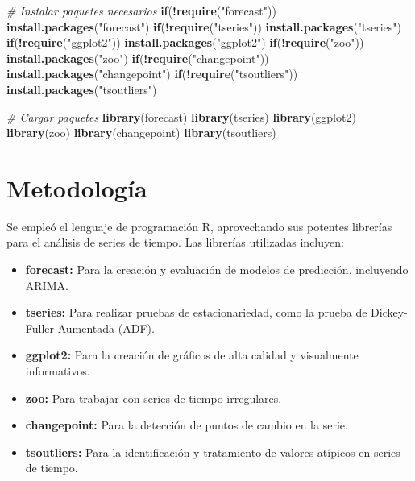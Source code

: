 \documentclass[
]{book}
\newenvironment{Shaded}{\begin{snugshade}}{\end{snugshade}}
\newcommand{\CommentTok}[1]{\textcolor[rgb]{0.56,0.35,0.01}{\textit{#1}}}
\newcommand{\ControlFlowTok}[1]{\textcolor[rgb]{0.13,0.29,0.53}{\textbf{#1}}}
\newcommand{\FunctionTok}[1]{\textcolor[rgb]{0.13,0.29,0.53}{\textbf{#1}}}
\newcommand{\NormalTok}[1]{#1}
\newcommand{\SpecialCharTok}[1]{\textcolor[rgb]{0.81,0.36,0.00}{\textbf{#1}}}
\newcommand{\StringTok}[1]{\textcolor[rgb]{0.31,0.60,0.02}{#1}}
\begin{document}
\begin{Shaded}
\begin{Highlighting}[]
\CommentTok{\# Instalar paquetes necesarios}
\ControlFlowTok{if}\NormalTok{(}\SpecialCharTok{!}\FunctionTok{require}\NormalTok{(}\StringTok{"forecast"}\NormalTok{)) }\FunctionTok{install.packages}\NormalTok{(}\StringTok{"forecast"}\NormalTok{)}
\ControlFlowTok{if}\NormalTok{(}\SpecialCharTok{!}\FunctionTok{require}\NormalTok{(}\StringTok{"tseries"}\NormalTok{)) }\FunctionTok{install.packages}\NormalTok{(}\StringTok{"tseries"}\NormalTok{)}
\ControlFlowTok{if}\NormalTok{(}\SpecialCharTok{!}\FunctionTok{require}\NormalTok{(}\StringTok{"ggplot2"}\NormalTok{)) }\FunctionTok{install.packages}\NormalTok{(}\StringTok{"ggplot2"}\NormalTok{)}
\ControlFlowTok{if}\NormalTok{(}\SpecialCharTok{!}\FunctionTok{require}\NormalTok{(}\StringTok{"zoo"}\NormalTok{)) }\FunctionTok{install.packages}\NormalTok{(}\StringTok{"zoo"}\NormalTok{)}
\ControlFlowTok{if}\NormalTok{(}\SpecialCharTok{!}\FunctionTok{require}\NormalTok{(}\StringTok{"changepoint"}\NormalTok{)) }\FunctionTok{install.packages}\NormalTok{(}\StringTok{"changepoint"}\NormalTok{)}
\ControlFlowTok{if}\NormalTok{(}\SpecialCharTok{!}\FunctionTok{require}\NormalTok{(}\StringTok{"tsoutliers"}\NormalTok{)) }\FunctionTok{install.packages}\NormalTok{(}\StringTok{"tsoutliers"}\NormalTok{)}


\CommentTok{\# Cargar paquetes}
\FunctionTok{library}\NormalTok{(forecast)}
\FunctionTok{library}\NormalTok{(tseries)}
\FunctionTok{library}\NormalTok{(ggplot2)}
\FunctionTok{library}\NormalTok{(zoo)}
\FunctionTok{library}\NormalTok{(changepoint)}
\FunctionTok{library}\NormalTok{(tsoutliers)}
\end{Highlighting}
\end{Shaded}

\section{Metodología}\label{metodologuxeda}

Se empleó el lenguaje de programación R, aprovechando sus potentes librerías para el análisis de series de tiempo. Las librerías utilizadas incluyen:

\begin{itemize}
\item
  \textbf{forecast:} Para la creación y evaluación de modelos de predicción, incluyendo ARIMA.
\item
  \textbf{tseries:} Para realizar pruebas de estacionariedad, como la prueba de Dickey-Fuller Aumentada (ADF).
\item
  \textbf{ggplot2:} Para la creación de gráficos de alta calidad y visualmente informativos.
\item
  \textbf{zoo:} Para trabajar con series de tiempo irregulares.
\item
  \textbf{changepoint:} Para la detección de puntos de cambio en la serie.
\item
  \textbf{tsoutliers:} Para la identificación y tratamiento de valores atípicos en series de tiempo.
\end{itemize}
\end{document}
